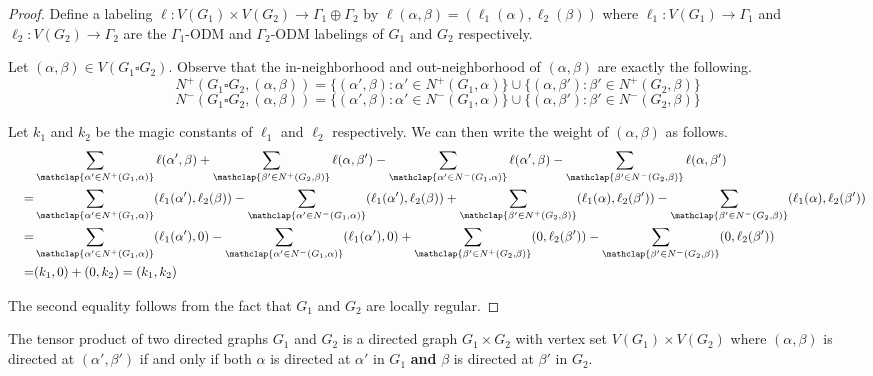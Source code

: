 \begin{proof}
Define a labeling \(\ell: V(G_1) \times V(G_2) \rightarrow \Gamma_1 \oplus \Gamma_2\)
by \(\ell(\alpha, \beta) = (\ell_1(\alpha), \ell_2(\beta))\)
where \(\ell_1: V(G_1) \rightarrow \Gamma_1\) and \(\ell_2: V(G_2) \rightarrow \Gamma_2\) are the \(\Gamma_1\)-ODM and \(\Gamma_2\)-ODM labelings of \(G_1\) and \(G_2\) respectively.

Let \((\alpha, \beta) \in V(G_1 \square G_2)\).
Observe that the in-neighborhood and out-neighborhood of \((\alpha, \beta)\) are exactly the following.
\[
N^+(G_1 \square G_2, (\alpha, \beta)) =
\{(\alpha', \beta) : \alpha' \in N^+(G_1, \alpha)\} \cup \{(\alpha, \beta') : \beta' \in N^+(G_2, \beta)\}
\]
\[
N^-(G_1 \square G_2, (\alpha, \beta)) =
\{(\alpha', \beta) : \alpha' \in N^-(G_1, \alpha)\} \cup \{(\alpha, \beta') : \beta' \in N^-(G_2, \beta)\}
\]

Let \(k_1\) and \(k_2\) be the magic constants of \(\ell_1\) and \(\ell_2\) respectively.
We can then write the weight of \((\alpha, \beta)\) as follows.
\begin{align*}
\hspace{.66cm}
&
 \sum_{\mathclap{\alpha '\in N^+(G_1, \alpha)}} \ell(\alpha', \beta)
+ \sum_{\mathclap{\beta' \in N^+(G_2, \beta)}} \ell(\alpha, \beta')
- \sum_{\mathclap{\alpha' \in N^-(G_1, \alpha)}} \ell(\alpha', \beta)
- \sum_{\mathclap{\beta' \in N^-(G_2, \beta)}} \ell(\alpha, \beta') \\
=&
\sum_{\mathclap{\alpha '\in N^+(G_1, \alpha)}}   (\ell_1(\alpha'), \ell_2(\beta))
- \sum_{\mathclap{\alpha' \in N^-(G_1, \alpha)}} (\ell_1(\alpha'), \ell_2(\beta))
+ \sum_{\mathclap{\beta' \in N^+(G_2, \beta)}}   (\ell_1(\alpha),  \ell_2(\beta'))
- \sum_{\mathclap{\beta' \in N^-(G_2, \beta)}}   (\ell_1(\alpha),  \ell_2(\beta')) \\
=&
\sum_{\mathclap{\alpha '\in N^+(G_1, \alpha)}}   (\ell_1(\alpha'), 0)
- \sum_{\mathclap{\alpha' \in N^-(G_1, \alpha)}} (\ell_1(\alpha'), 0)
+ \sum_{\mathclap{\beta' \in N^+(G_2, \beta)}}   (0,  \ell_2(\beta'))
- \sum_{\mathclap{\beta' \in N^-(G_2, \beta)}}   (0,  \ell_2(\beta')) \\
=&
(k_1, 0) + (0, k_2) = (k_1, k_2)
\end{align*}

The second equality follows from the fact that \(G_1\) and \(G_2\) are locally regular.

\end{proof}


\begin{definition}
The tensor product of two directed graphs \(G_1\) and \(G_2\) is a directed graph \(G_1 \times G_2\)
with vertex set \(V(G_1) \times V(G_2)\) where
\((\alpha, \beta)\) is directed at \((\alpha',\beta')\) if and only if both \(\alpha\) is directed at \(\alpha'\) in \(G_1\)
\textbf{and} \(\beta\) is directed at \(\beta'\) in \(G_2\).
\end{definition}

